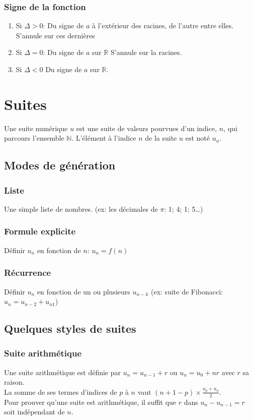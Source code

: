 \documentclass{article}
\begin{document}
\subsubsection{Signe de la fonction}
\begin{enumerate}
	\item Si $\Delta > 0$: Du signe de $a$ à l'extérieur des racines, de l'autre entre elles. S'annule sur ces dernières
	\item Si $\Delta = 0$: Du signe de $a$ sur $\mathbb{R}$ S'annule sur la racines.
	\item Si $\Delta < 0$ Du signe de $a$ sur $\mathbb{R}$.
\end{enumerate}



\section{Suites}


Une suite numérique $u$ est une suite de valeurs pourvues d'un indice, $n$, qui parcours l'ensemble $\mathbb{N}$. L'élément à l'indice $n$ de la suite $u$ est noté $u_n$.


\subsection{Modes de génération}

\subsubsection{Liste}
Une simple liste de nombres. (ex: les décimales de $\pi$: 1; 4; 1; 5\dots)

\subsubsection{Formule explicite}
Définir $u_n$ en fonction de $n$: $u_n = f(n)$

\subsubsection{Récurrence}
Définir $u_n$ en fonction de un ou plusieurs $u_{n-k}$ (ex: suite de Fibonacci: $u_n = u_{n-2} + u_{n1}$)


\subsection{Quelques styles de suites}

\subsubsection{Suite arithmétique}
Une suite arithmétique est définie par $u_n = u_{n-1} + r$ ou $u_n = u_0 + nr$ avec $r$ sa raison.\\
La somme de ses termes d'indices de $p$ à $n$ vaut $(n+1-p)\times \frac{u_p+u_n}{2}$.\\
Pour prouver qu'une suite est arithmétique, il suffit que $r$ dans $u_n - u_{n-1} = r$ soit indépendant de $n$.
\end{document}
